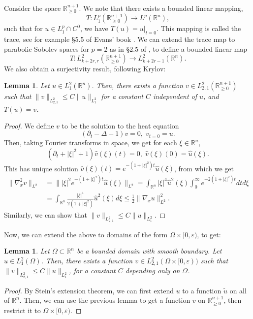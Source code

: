 \documentclass[10pt, a4paper]{article}
\theoremstyle{plain}%
\newtheorem{lem}[theorem]{Lemma}
\theoremstyle{definition}
\numberwithin{figure}{section}
\numberwithin{equation}{section}
\newcommand{\bR}{\mathbb{R}}
\newcommand{\pa}{\partial}
\newcommand{\rt}{\rightarrow}
\newcommand{\tu}{\tilde{u}}
\newcommand{\ep}{\varepsilon}
\begin{document}
Consider the space $\bR^{n+1}_{\geq0}$. We note that there exists a bounded linear mapping, \[
T: L^p_1(\bR^{n+1}_{\geq0}) \rt L^p(\bR^n), 
\]
such that for $u\in L^p_1\cap C^0$, we have $T(u)=u|_{t=0}$. This mapping is called the trace, see for example \S 5.5 of Evans' book \cite{Eva10}. We can extend the trace map to parabolic Sobolev spaces for $p=2$ as in \S 2.5 of \cite{Kry08}, to define a bounded linear map\[
T: L^2_{k+2r,r}(\bR^{n+1}_{\geq 0})\rt L^2_{k+2r-1}(\bR^n).
\]
We also obtain a surjectivity result, following Krylov:
\begin{lem}
	Let $u\in L^2_1(\bR^n)$. Then, there exists a function $v\in L^2_{2,1}(\bR^{n+1}_{\geq0})$ such that $\|v\|_{L^2_{2,1}}\leq C\|u\|_{L^2_1}$ for a constant $C$ independent of $u$, and $T(u)=v$. 
\end{lem}
\begin{proof}
	We define $v$ to be the solution to the heat equation \[
	(\pa_t-\Delta+1)v=0, \; v_{t=0}=u.
	\]
	Then, taking Fourier transforms in space, we get for each $\xi\in \bR^n$,\[
	(\pa_t+|\xi|^2+1)\hat{v}(\xi)(t)=0,\; \hat{v}(\xi)(0)=\hat{u}(\xi).  
	\]
	This has unique solution $\hat{v}(\xi)(t)= e^{-(1+|\xi|^2)t}\hat{u}(\xi)$, from which we get 
	\begin{equation*}\begin{split}
			\|\nabla_x^2v\|_{L^2} &= \||\xi|^2e^{-(1+|\xi|^2)t}\hat{u}(\xi)\|_{L^2} = \int_{\bR^n}|\xi|^4\hat{u}^2(\xi) \int_0^\infty e^{-2(1+|\xi|^2)t}dtd\xi \\
			&= \int_{\bR^n}\frac{|\xi|^4}{2(1+|\xi|^2)}\hat{u}^2(\xi)d\xi \leq \frac{1}{2}\|\nabla_x u\|^2_{L^2}.
		\end{split}
	\end{equation*}
	Similarly, we can show that $\|v\|_{L^2_{2,1}}\leq C\|u\|_{L^2_1}$.
\end{proof}
Now, we can extend the above to domains of the form $\Omega\times[0,\ep)$, to get:
\begin{lem}
	Let $\Omega \subset \bR^n$ be a bounded domain with smooth boundary. Let $u\in L^2_1(\Omega)$. Then, there exists a function $v\in L^2_{2,1}(\Omega\times[0,\ep))$ such that $\|v\|_{L^2_{2,1}}\leq C\|u\|_{L^2_{1}}$, for a constant $C$ depending only on $\Omega$.
\end{lem}
\begin{proof}
	By Stein's extension theorem, we can first extend $u$ to a function $\tu$ on all of $\bR^n$. Then, we can use the previous lemma to get a function $v$ on $\bR^{n+1}_{\geq0}$, then restrict it to $\Omega\times[0,\ep)$.
\end{proof}
\end{document}
